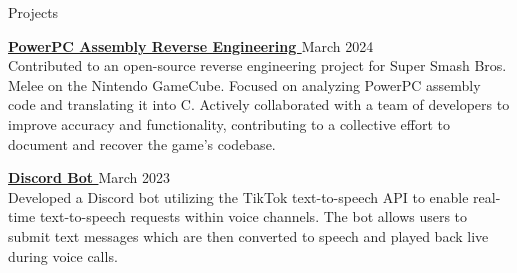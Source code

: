 \documentclass{resume}
\newcommand{\scaledfaExternalLink}{\raisebox{0.1\height}{\scalebox{0.7}{\faExternalLink*}}}
\begin{document}
\begin{rSection}{Projects}

	\item {\bf \href{https://github.com/search?q=repo%3Adoldecomp%2Fmelee++author%3Awyatt-avilla&type=pullrequests&ref=advsearch}{PowerPC Assembly Reverse Engineering \scaledfaExternalLink}} {\hfill March 2024} \\
	Contributed to an open-source reverse engineering project for Super Smash Bros. Melee on the Nintendo GameCube. Focused on analyzing PowerPC assembly code and translating it into C. Actively collaborated with a team of developers to improve accuracy and functionality, contributing to a collective effort to document and recover the game's codebase.

	\item {\bf \href{https://github.com/wyatt-avilla/discord-tiktok-tts-bot}{Discord Bot \scaledfaExternalLink}} {\hfill March 2023} \\
	Developed a Discord bot utilizing the TikTok text-to-speech API to enable real-time text-to-speech requests within voice channels. The bot allows users to submit text messages which are then converted to speech and played back live during voice calls.

\end{rSection}
\end{document}
